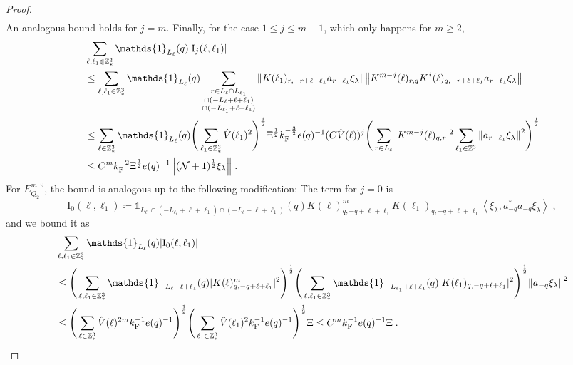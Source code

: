 \documentclass[12pt,a4paper]{article}
\numberwithin{equation}{section}
\newcommand{\1}{\mathbb{I}}
\newcommand{\F}{\mathrm{F}}
\newcommand{\I}{\mathrm{I}}
\newcommand{\Z}{\mathbb{Z}}
\newcommand{\NN}{\mathcal{N}}
\newcommand{\half}{\frac{1}{2}}
\newcommand{\eva}[1]{\left\langle #1 \right\rangle}
\theoremstyle{plain}
\theoremstyle{definition}
\theoremstyle{remark}
\theoremstyle{plain}
\theoremstyle{definition}
\theoremstyle{remark}
\begin{document}
\begin{proof}
\begin{align}
\end{align}
An analogous bound holds for $ j = m $. Finally, for the case $ 1 \le j \le m-1 $, which only happens for $ m \ge 2 $,
\begin{align}
	&\sum_{\ell,\ell_1 \in \Z^3_*} \mathds{1}_{L_\ell}(q) |\I_j(\ell, \ell_1)| \nonumber\\
	&\leq \sum_{\ell,\ell_1 \in \Z^3_*} \mathds{1}_{L_\ell}(q) \sum\limits_{\substack{r\in L_{\ell} \cap L_{\ell_1}\\\cap (-L_{\ell}+\ell+\ell_1) \\ \cap (-L_{\ell_1}+\ell+\ell_1)}} \norm{ K(\ell_1)_{r,-r+\ell+\ell_1} a_{r-\ell_1} \xi_\lambda} \norm{ K^{m-j}(\ell)_{r,q} K^j(\ell)_{q,-r+\ell+\ell_1} a_{r-\ell_1} \xi_\lambda} \nonumber\\
	&\leq \sum_{\ell \in \Z^3_*} \mathds{1}_{L_\ell}(q)
		\Bigg( \sum_{\ell_1 \in \Z^3_*} \hat{V}(\ell_1)^2 \Bigg)^{\half}
		\Xi^{\half} k_{\F}^{-\frac 32} e(q)^{-1} (C \hat{V}(\ell))^j
		\Bigg( \sum_{r \in L_{\ell}} |K^{m-j}(\ell)_{q,r}|^2 
		\sum_{\ell_1 \in \Z^3} \norm{a_{r-\ell_1} \xi_\lambda}^2 \Bigg)^{\half} \nonumber\\
	&\leq C^m k_{\F}^{-2} \Xi^{\half} e(q)^{-1} \norm{(\NN+1)^{\half} \xi_\lambda} \;. \label{eq:estEQ2182}
\end{align}
For $ E_{Q_2}^{m,9} $, the bound is analogous up to the following modification: The term for $ j = 0 $ is
\begin{equation}
	\I_0(\ell,\ell_1)
	\coloneq \mathds{1}_{L_{\ell_1} \cap (-L_{\ell_1} + \ell+\ell_1) \cap (-L_\ell + \ell+\ell_1)}(q)
		K(\ell)^m_{q,-q+\ell+\ell_1}
		K(\ell_1)_{q,-q+\ell+\ell_1}
		\eva{\xi_\lambda, a_{-q}^* a_{-q} \xi_\lambda} \;,
\end{equation}
and we bound it as
\begin{align}
	&\sum_{\ell,\ell_1 \in \Z^3_*} \mathds{1}_{L_\ell}(q) |\I_0(\ell,\ell_1)| \nonumber\\
	&\leq \Bigg( \sum_{\ell, \ell_1 \in \Z^3_*} \mathds{1}_{-L_\ell + \ell+\ell_1}(q) |K(\ell)^m_{q,-q+\ell+\ell_1}|^2 \Bigg)^{\half}
		\Bigg( \sum_{\ell, \ell_1 \in \Z^3_*} \mathds{1}_{-L_{\ell_1} + \ell+\ell_1}(q) |K(\ell_1)_{q,-q+\ell+\ell_1}|^2 \Bigg)^{\half}
	\norm{ a_{-q} \xi_\lambda }^2 \nonumber\\
	&\leq \Bigg( \sum_{\ell\in \Z^3_*} \hat{V}(\ell)^{2m} k_{\F}^{-1} e(q)^{-1} \Bigg)^{\half}
		\Bigg( \sum_{\ell_1 \in \Z^3_*} \hat{V}(\ell_1)^2 k_{\F}^{-1} e(q)^{-1} \Bigg)^{\half}
	\Xi
	\leq C^m
		k_{\F}^{-1} e(q)^{-1} \Xi \;.\label{eq:estEQ2181_bis}
\end{align}
\end{proof}
\end{document}
